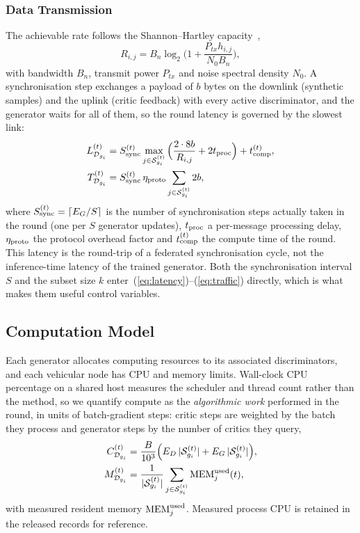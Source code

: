 \documentclass[journal]{IEEEtran}
\begin{document}
\subsubsection{Data Transmission}
The achievable rate follows the Shannon--Hartley capacity~\cite{rappaport2002wireless},
\begin{equation}
R_{i,j}=B_n\log_2\!\Big(1+\frac{P_{tx}h_{i,j}}{N_0B_n}\Big),
\label{eq:rate}
\end{equation}
with bandwidth $B_n$, transmit power $P_{tx}$ and noise spectral density $N_0$.
A synchronisation step exchanges a payload of $b$ bytes on the downlink
(synthetic samples) and the uplink (critic feedback) with every active
discriminator, and the generator waits for all of them, so the round latency is
governed by the slowest link:
\begin{align}
L^{(t)}_{\mathcal{D}_{g_i}}&=S^{(t)}_{\rm sync}\max_{j\in\mathcal{S}^{(t)}_{g_i}}
 \Big(\frac{2\cdot 8b}{R_{i,j}}+2t_{\rm proc}\Big)+t^{(t)}_{\rm comp},
\label{eq:latency}\\
T^{(t)}_{\mathcal{D}_{g_i}}&=S^{(t)}_{\rm sync}\,\eta_{\rm proto}\sum_{j\in\mathcal{S}^{(t)}_{g_i}}2b,
\label{eq:traffic}
\end{align}
where $S^{(t)}_{\rm sync}=\lceil E_G/S\rceil$ is the number of synchronisation
steps actually taken in the round (one per $S$ generator updates), $t_{\rm proc}$
a per-message processing delay, $\eta_{\rm proto}$ the protocol overhead
factor and $t^{(t)}_{\rm comp}$ the compute time of the round. This latency is
the round-trip of a federated synchronisation cycle, not the inference-time
latency of the trained generator. Both the synchronisation interval $S$ and the
subset size $k$ enter~(\ref{eq:latency})--(\ref{eq:traffic}) directly, which is
what makes them useful control variables.

\subsection{Computation Model}
Each generator allocates computing resources to its associated discriminators,
and each vehicular node has CPU and memory limits. Wall-clock CPU percentage on
a shared host measures the scheduler and thread count rather than the method,
so we quantify compute as the \emph{algorithmic work} performed in the round,
in units of batch-gradient steps: critic steps are weighted by the batch they
process and generator steps by the number of critics they query,
\begin{align}
C^{(t)}_{\mathcal{D}_{g_i}}&=\frac{B}{10^3}\Big(E_D\,|\mathcal{S}^{(t)}_{g_i}|
 +E_G\,|\mathcal{S}^{(t)}_{g_i}|\Big),
\label{eq:cpu}\\
M^{(t)}_{\mathcal{D}_{g_i}}&=\frac{1}{|\mathcal{S}^{(t)}_{g_i}|}\sum_{j\in\mathcal{S}^{(t)}_{g_i}}
 \mathrm{MEM}^{\rm used}_j(t),
\label{eq:mem}
\end{align}
with measured resident memory $\mathrm{MEM}^{\rm used}_j$. Measured process CPU
is retained in the released records for reference.
\end{document}
